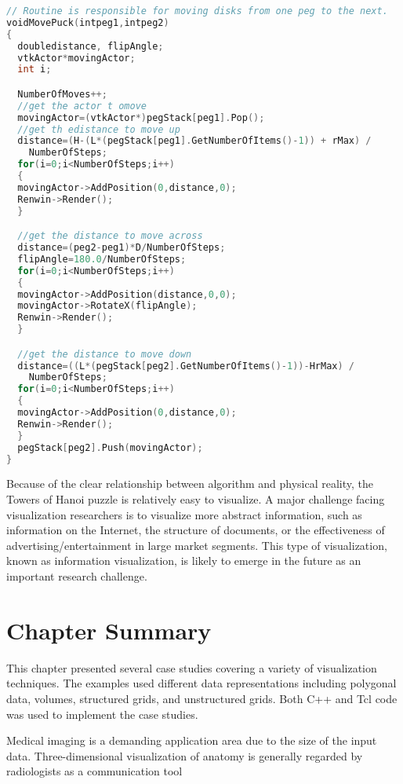 \begin{lstlisting}[language=C++, caption={Moving the puck.}]
// Routine is responsible for moving disks from one peg to the next.
voidMovePuck(intpeg1,intpeg2)
{
  doubledistance, flipAngle;
  vtkActor*movingActor;
  int i;

  NumberOfMoves++;
  //get the actor t omove
  movingActor=(vtkActor*)pegStack[peg1].Pop();
  //get th edistance to move up
  distance=(H-(L*(pegStack[peg1].GetNumberOfItems()-1)) + rMax) /
    NumberOfSteps;
  for(i=0;i<NumberOfSteps;i++)
  {
  movingActor->AddPosition(0,distance,0);
  Renwin->Render();
  }

  //get the distance to move across
  distance=(peg2-peg1)*D/NumberOfSteps;
  flipAngle=180.0/NumberOfSteps;
  for(i=0;i<NumberOfSteps;i++)
  {
  movingActor->AddPosition(distance,0,0);
  movingActor->RotateX(flipAngle);
  Renwin->Render();
  }

  //get the distance to move down
  distance=((L*(pegStack[peg2].GetNumberOfItems()-1))-HrMax) /
    NumberOfSteps;
  for(i=0;i<NumberOfSteps;i++)
  {
  movingActor->AddPosition(0,distance,0);
  Renwin->Render();
  }
  pegStack[peg2].Push(movingActor);
}
\end{lstlisting}

Because of the clear relationship between algorithm and physical reality, the Towers of Hanoi puzzle is relatively easy to visualize. A major challenge facing visualization researchers is to visualize more abstract information, such as information on the Internet, the structure of documents, or the effectiveness of advertising/entertainment in large market segments. This type of visualization, known as information visualization, is likely to emerge in the future as an important research challenge.

\section{Chapter Summary}

This chapter presented several case studies covering a variety of visualization techniques. The examples used different data representations including polygonal data, volumes, structured grids, and unstructured grids. Both C++ and Tcl code was used to implement the case studies.

Medical imaging is a demanding application area due to the size of the input data. Three-dimensional visualization of anatomy is generally regarded by radiologists as a communication tool

